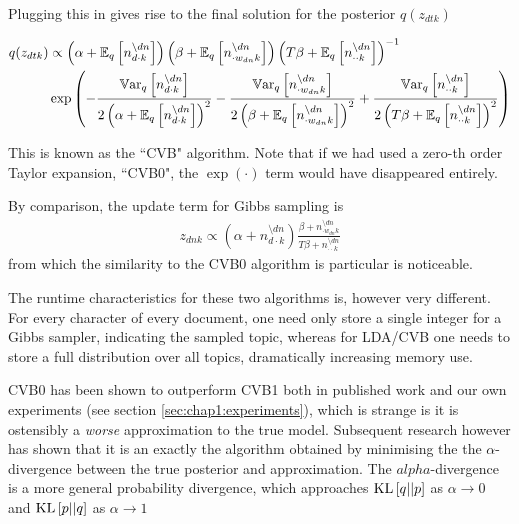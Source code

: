 Plugging this in gives rise to the final solution for the posterior $q(z_{dtk})$

{\small
\begin{align}
\begin{split}
q(z_{dtk}) & \propto
\left(\alpha + \ex{n_{d\cdot k}^{\setminus dn}}{q}\right)
\left(\beta + \ex{n_{\cdot w_{dn} k}^{\setminus dn}}{q}\right)
\invb{T \beta + \ex{n_{\cdot \cdot k}^{\setminus dn}}{q}}\\
&\exp\left(
    -\frac{
        \var{n_{d\cdot k}^{\setminus dn}}{q}
    } {
    2 \left(\alpha + \ex{n_{d\cdot k}^{\setminus dn}}{q}\right)^2
    }
    -\frac{
        \var{n_{\cdot w_{dn} k}^{\setminus dn}}{q}
    } {
    2 \left(\beta + \ex{n_{\cdot w_{dn} k}^{\setminus dn}}{q}\right)^2
    }
    +\frac{
        \var{n_{\cdot \cdot k}^{\setminus dn}}{q}
    } {
    2 \left(T \beta + \ex{n_{\cdot \cdot k}^{\setminus dn}}{q}\right)^2
    }
\right)
\end{split}\label{eqn:lda-cvb-update}
\end{align}
}


This is known as the ``CVB" algorithm. Note that if we had used a zero-th order Taylor expansion, ``CVB0", the $\exp(\cdot)$ term would have disappeared entirely.

By comparison, the update term for Gibbs sampling is 
\begin{align}
z_{dnk} \propto 
\left(\alpha + n_{d\cdot k}^{\setminus dn}\right)
\frac{
        \beta + n_{\cdot w_{dn} k}^{\setminus dn}
     } {
        T \beta + n_{\cdot \cdot k}^{\setminus dn}
    }\label{eqn:lda-gibbs-update}
\end{align}
from which the similarity to the CVB0 algorithm is particular is noticeable.

The runtime characteristics for these two algorithms is, however very different. For every character of every document, one need only store a single integer for a Gibbs sampler, indicating the sampled topic, whereas for LDA/CVB one needs to store a full distribution over all topics, dramatically increasing memory use.

CVB0 has been shown to outperform CVB1 both in published work\cite{Asuncion2012}\cite{Teh2007} and our own experiments (see section \ref{sec:chap1:experiments}), which is strange is it is ostensibly a \emph{worse} approximation to the true model. Subsequent research\cite{Sato2012} however has shown that it is an exactly the algorithm obtained by minimising the the $\alpha$-divergence between the true posterior and approximation. The $alpha$-divergence is a more general probability divergence, which approaches $\kl{q}{p}$ as $\alpha \rightarrow 0$ and $\kl{p}{q}$ as $\alpha \rightarrow 1$

